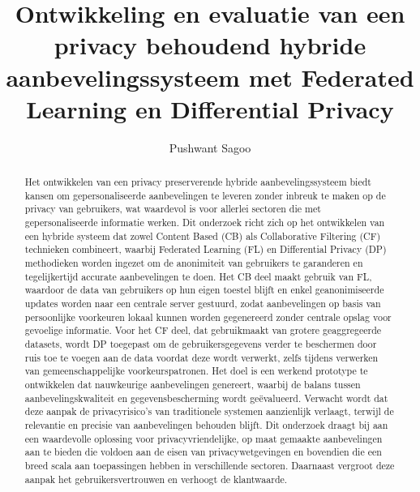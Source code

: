 \documentclass{hogent-article}
\title{Ontwikkeling en evaluatie van een privacy behoudend hybride aanbevelingssysteem met Federated Learning en Differential Privacy}
\author{Pushwant Sagoo}
\begin{document}
\begin{abstract}
  Het ontwikkelen van een privacy preserverende hybride aanbevelingssysteem biedt kansen om gepersonaliseerde aanbevelingen te leveren zonder inbreuk te maken op de privacy van gebruikers, wat waardevol is voor allerlei sectoren die met gepersonaliseerde informatie werken. Dit onderzoek richt zich op het ontwikkelen van een hybride systeem dat zowel Content Based (CB) als Collaborative Filtering (CF) technieken combineert, waarbij Federated Learning (FL) en Differential Privacy (DP) methodieken worden ingezet om de anonimiteit van gebruikers te garanderen en tegelijkertijd accurate aanbevelingen te doen. Het CB deel maakt gebruik van FL, waardoor de data van gebruikers op hun eigen toestel blijft en enkel geanonimiseerde updates worden naar een centrale server gestuurd, zodat aanbevelingen op basis van persoonlijke voorkeuren lokaal kunnen worden gegenereerd zonder centrale opslag voor gevoelige informatie. Voor het CF deel, dat gebruikmaakt van grotere geaggregeerde datasets, wordt DP toegepast om de gebruikersgegevens verder te beschermen door ruis toe te voegen aan de data voordat deze wordt verwerkt, zelfs tijdens verwerken van gemeenschappelijke voorkeurspatronen. Het doel is een werkend prototype te ontwikkelen dat nauwkeurige aanbevelingen genereert, waarbij de balans tussen aanbevelingskwaliteit en gegevensbescherming wordt geëvalueerd. Verwacht wordt dat deze aanpak de privacyrisico's van traditionele systemen aanzienlijk verlaagt, terwijl de relevantie en precisie van aanbevelingen behouden blijft. Dit onderzoek draagt bij aan een waardevolle oplossing voor privacyvriendelijke, op maat gemaakte aanbevelingen aan te bieden die voldoen aan de eisen van privacywetgevingen en bovendien die een breed scala aan toepassingen hebben in verschillende sectoren. Daarnaast vergroot deze aanpak het gebruikersvertrouwen en verhoogt de klantwaarde.
\end{abstract}

\tableofcontents



\printbibliography[heading=bibintoc]
\end{document}
